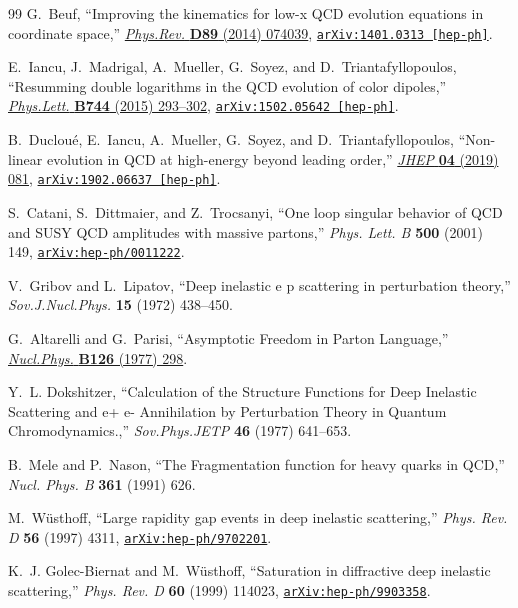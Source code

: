 \begin{thebibliography}{99}
G.~Beuf, ``{Improving the kinematics for low-x QCD evolution equations in
  coordinate space},'' \href{http://dx.doi.org/10.1103/PhysRevD.89.074039}{{\em
  Phys.Rev.} {\bf D89} (2014)  074039},
\href{http://arxiv.org/abs/1401.0313}{{\tt arXiv:1401.0313 [hep-ph]}}.

E.~Iancu, J.~Madrigal, A.~Mueller, G.~Soyez, and D.~Triantafyllopoulos,
  ``{Resumming double logarithms in the QCD evolution of color dipoles},''
  \href{http://dx.doi.org/10.1016/j.physletb.2015.03.068}{{\em Phys.Lett.} {\bf
  B744} (2015)  293--302},
\href{http://arxiv.org/abs/1502.05642}{{\tt arXiv:1502.05642 [hep-ph]}}.

B.~Duclou\'e, E.~Iancu, A.~Mueller, G.~Soyez, and D.~Triantafyllopoulos,
  ``{Non-linear evolution in QCD at high-energy beyond leading order},''
  \href{http://dx.doi.org/10.1007/JHEP04(2019)081}{{\em JHEP} {\bf 04} (2019)
  081}, \href{http://arxiv.org/abs/1902.06637}{{\tt arXiv:1902.06637
  [hep-ph]}}.

S.~Catani, S.~Dittmaier, and Z.~Trocsanyi, ``{One loop singular behavior of QCD and SUSY QCD amplitudes with massive partons},'' {\em Phys. Lett. B} {\bf 500} (2001) 149, \href{http://arxiv.org/abs/hep-ph/0011222}{{\tt arXiv:hep-ph/0011222}}.

V.~Gribov and L.~Lipatov, ``{Deep inelastic e p scattering in perturbation
  theory},''
{\em Sov.J.Nucl.Phys.} {\bf 15} (1972)  438--450.

G.~Altarelli and G.~Parisi, ``{Asymptotic Freedom in Parton Language},''
\href{http://dx.doi.org/10.1016/0550-3213(77)90384-4}{{\em Nucl.Phys.} {\bf
  B126} (1977)  298}.

Y.~L. Dokshitzer, ``{Calculation of the Structure Functions for Deep Inelastic
  Scattering and e+ e- Annihilation by Perturbation Theory in Quantum
  Chromodynamics.},''
{\em Sov.Phys.JETP} {\bf 46} (1977)  641--653.

B.~Mele and P.~Nason, ``{The Fragmentation function for heavy quarks in QCD},'' {\em Nucl. Phys. B} {\bf 361} (1991) 626.

M.~W\"usthoff, ``{Large rapidity gap events in deep inelastic scattering},'' {\em Phys. Rev. D} {\bf 56} (1997) 4311, \href{http://arxiv.org/abs/hep-ph/9702201}{{\tt arXiv:hep-ph/9702201}}.

K.~J. Golec-Biernat and M.~W\"usthoff, ``{Saturation in diffractive deep inelastic scattering},'' {\em Phys. Rev. D} {\bf 60} (1999) 114023, \href{http://arxiv.org/abs/hep-ph/9903358}{{\tt arXiv:hep-ph/9903358}}.


\end{thebibliography}

